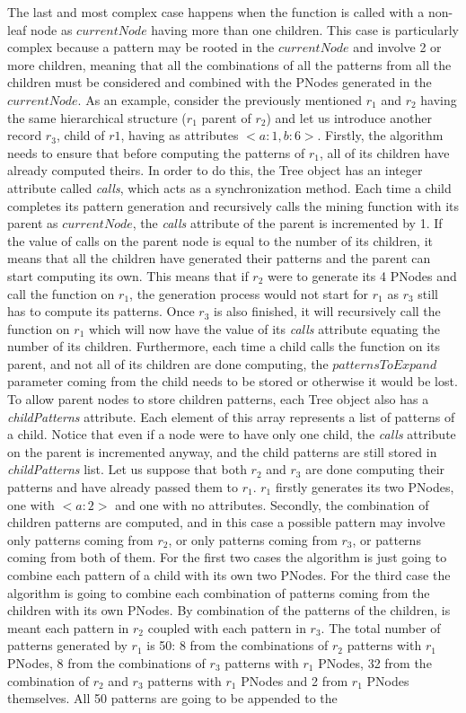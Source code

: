 \documentclass{acm_proc_article-sp-sigmod09}
\begin{document}
The last and most complex case happens when the function is called with a non-leaf node as $currentNode$ having more than one children. This case is particularly complex because a pattern may be rooted in the $currentNode$ and involve 2 or more children, meaning that all the combinations of all the patterns from all the children must be considered and combined with the PNodes generated in the $currentNode$. As an example, consider the previously mentioned $r_1$ and $r_2$ having the same hierarchical structure ($r_1$ parent of $r_2$) and let us introduce another record $r_3$, child of $r1$, having as attributes $<a \colon 1, b \colon 6>$. Firstly, the algorithm needs to ensure that before computing the patterns of $r_1$, all of its children have already computed theirs. In order to do this, the Tree object has an integer attribute called \emph{calls}, which acts as a synchronization method. Each time a child completes its pattern generation and recursively calls the mining function with its parent as $currentNode$, the \emph{calls} attribute of the parent is incremented by 1. If the value of calls on the parent node is equal to the number of its children, it means that all the children have generated their patterns and the parent can start computing its own. This means that if $r_2$ were to generate its 4 PNodes and call the function on $r_1$, the generation process would not start for $r_1$ as $r_3$ still has to compute its patterns. Once $r_3$ is also finished, it will recursively call the function on $r_1$ which will now have the value of its \emph{calls} attribute equating the number of its children. Furthermore, each time a child calls the function on its parent, and not all of its children are done computing, the $patternsToExpand$ parameter coming from the child needs to be stored or otherwise it would be lost. To allow parent nodes to store children patterns, each Tree object also has a \emph{childPatterns} attribute. Each element of this array represents a list of patterns of a child. Notice that even if a node were to have only one child, the \emph{calls} attribute on the parent is incremented anyway, and the child patterns are still stored in \emph{childPatterns} list. Let us suppose that both $r_2$ and $r_3$ are done computing their patterns and have already passed them to $r_1$. $r_1$ firstly generates its two PNodes, one with $<a \colon 2>$ and one with no attributes. Secondly, the combination of children patterns are computed, and in this case a possible pattern may involve only patterns coming from $r_2$, or only patterns coming from $r_3$, or patterns coming from both of them. For the first two cases the algorithm is just going to combine each pattern of a child with its own two PNodes. For the third case the algorithm is going to combine each combination of patterns coming from the children with its own PNodes. By combination of the patterns of the children, is meant each pattern in $r_2$ coupled with each pattern in $r_3$. The total number of patterns generated by $r_1$ is 50: 8 from the combinations of $r_2$ patterns with $r_1$ PNodes, 8 from the combinations of $r_3$ patterns with $r_1$ PNodes, 32 from the combination of $r_2$ and $r_3$ patterns with $r_1$ PNodes and 2 from $r_1$ PNodes themselves. All 50 patterns are going to be appended to the 
\end{document}
